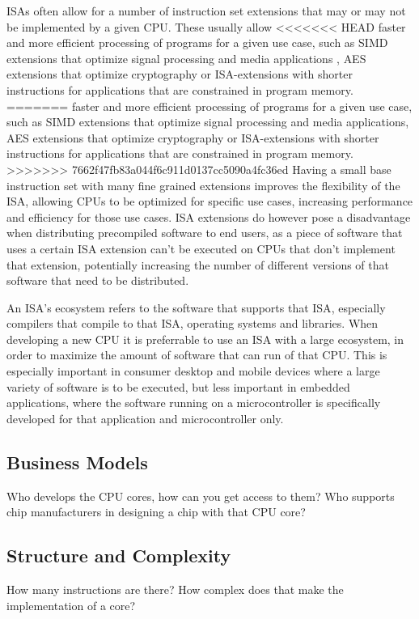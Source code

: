 \documentclass[conference]{IEEEtran}
\begin{document}
\glspl{ISA} often allow for a number of instruction set extensions that may or may not be implemented by a given \gls{CPU}. These usually allow
<<<<<<< HEAD
faster and more efficient processing of programs for a given use case, such as \gls{SIMD} extensions that optimize signal processing and media applications \cite[page 52]{Arm2020},
\gls{AES} extensions that optimize cryptography \cite{Arm2015} or \gls{ISA}-extensions with shorter instructions for applications that are constrained in program memory. \cite{Arm2005}
=======
faster and more efficient processing of programs for a given use case, such as \gls{SIMD} extensions that optimize signal processing and media applications,
\gls{AES} extensions that optimize cryptography or \gls{ISA}-extensions with shorter instructions for applications that are constrained in program memory.
>>>>>>> 7662f47fb83a044f6c911d0137cc5090a4fc36ed
Having a small base instruction set with many fine grained extensions improves the flexibility of the \gls{ISA}, allowing \glspl{CPU} to be optimized for specific
use cases, increasing performance and efficiency for those use cases. \gls{ISA} extensions do however pose a disadvantage when distributing precompiled software
to end users, as a piece of software that uses a certain \gls{ISA} extension can't be executed on \glspl{CPU} that don't implement that extension, potentially
increasing the number of different versions of that software that need to be distributed.

An \gls{ISA}'s ecosystem refers to the software that supports that \gls{ISA}, especially compilers that compile to that \gls{ISA}, operating systems and libraries.
When developing a new \gls{CPU} it is preferrable to use an \gls{ISA} with a large ecosystem, in order to maximize the amount of software
that can run of that \gls{CPU}. This is especially important in consumer desktop and mobile devices where a large variety of software is to be executed,
but less important in embedded applications, where the software running on a microcontroller is specifically developed for that application and microcontroller
only.

	\subsection{Business Models}
	Who develops the CPU cores, how can you get access to them? Who supports chip manufacturers in designing a chip with that CPU core?
	\subsection{Structure and Complexity}
	How many instructions are there? How complex does that make the implementation of a core?
\end{document}

